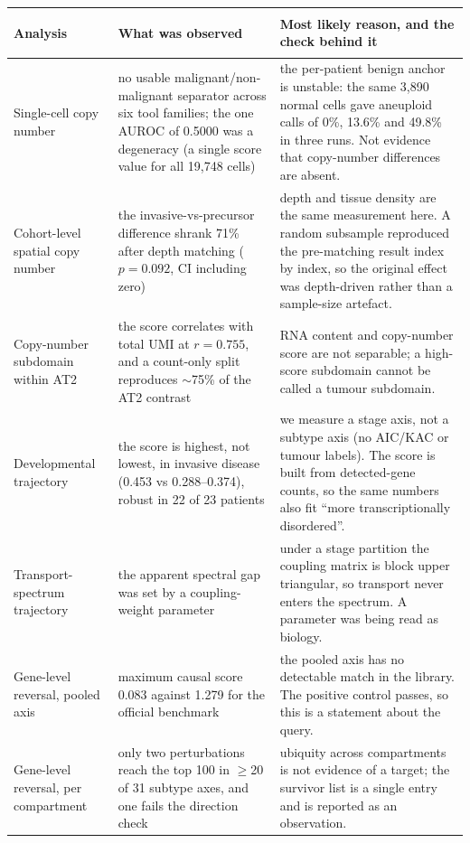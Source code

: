 \begin{table}[!ht]
\centering
\begin{tabularx}{\textwidth}{@{}>{\itshape\raggedright\arraybackslash}p{94pt}>{\raggedright\arraybackslash}p{152pt}X@{}}
\toprule
\tabheadfont Analysis & \tabheadfont What was observed & \tabheadfont Most likely reason, and the check behind it \\
\midrule
Single-cell copy number & no usable malignant/non-malignant separator across six tool families; the one AUROC of 0.5000 was a degeneracy (a single score value for all 19{,}748 cells) & the per-patient benign anchor is unstable: the same 3{,}890 normal cells gave aneuploid calls of 0\%, 13.6\% and 49.8\% in three runs. Not evidence that copy-number differences are absent. \\
\addlinespace[2pt]
Cohort-level spatial copy number & the invasive-vs-precursor difference shrank 71\% after depth matching ($p = 0.092$, CI including zero) & depth and tissue density are the same measurement here. A random subsample reproduced the pre-matching result index by index, so the original effect was depth-driven rather than a sample-size artefact. \\
\addlinespace[2pt]
Copy-number subdomain within AT2 & the score correlates with total UMI at $r = 0.755$, and a count-only split reproduces $\sim$75\% of the AT2 contrast & RNA content and copy-number score are not separable; a high-score subdomain cannot be called a tumour subdomain. \\
\addlinespace[2pt]
Developmental trajectory & the score is highest, not lowest, in invasive disease (0.453 vs 0.288--0.374), robust in 22 of 23 patients & we measure a stage axis, not a subtype axis (no AIC/KAC or tumour labels). The score is built from detected-gene counts, so the same numbers also fit ``more transcriptionally disordered''. \\
\addlinespace[2pt]
Transport-spectrum trajectory & the apparent spectral gap was set by a coupling-weight parameter & under a stage partition the coupling matrix is block upper triangular, so transport never enters the spectrum. A parameter was being read as biology. \\
\addlinespace[2pt]
Gene-level reversal, pooled axis & maximum causal score 0.083 against 1.279 for the official benchmark & the pooled axis has no detectable match in the library. The positive control passes, so this is a statement about the query. \\
\addlinespace[2pt]
Gene-level reversal, per compartment & only two perturbations reach the top 100 in $\geq$20 of 31 subtype axes, and one fails the direction check & ubiquity across compartments is not evidence of a target; the survivor list is a single entry and is reported as an observation. \\

\end{tabularx}
\end{table}
